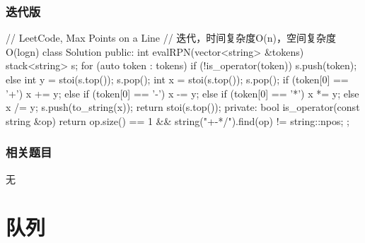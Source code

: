 \subsubsection{迭代版}
\begin{Code}
// LeetCode, Max Points on a Line
// 迭代，时间复杂度O(n)，空间复杂度O(logn)
class Solution {
public:
    int evalRPN(vector<string> &tokens) {
        stack<string> s;
        for (auto token : tokens) {
            if (!is_operator(token)) {
                s.push(token);
            } else {
                int y = stoi(s.top());
                s.pop();
                int x = stoi(s.top());
                s.pop();
                if (token[0] == '+')       x += y;
                else if (token[0] == '-')  x -= y;
                else if (token[0] == '*')  x *= y;
                else                       x /= y;
                s.push(to_string(x));
            }
        }
        return stoi(s.top());
    }
private:
    bool is_operator(const string &op) {
        return op.size() == 1 && string("+-*/").find(op) != string::npos;
    }
};
\end{Code}


\subsubsection{相关题目}
\begindot
\item 无
\myenddot


\section{队列} %

